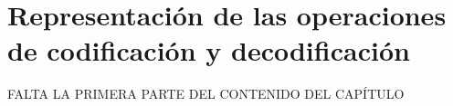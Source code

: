 \chapter{Representaci\'{o}n de las operaciones de codificaci\'{o}n y decodificaci\'{o}n}

FALTA LA PRIMERA PARTE DEL CONTENIDO DEL CAP\'{I}TULO

